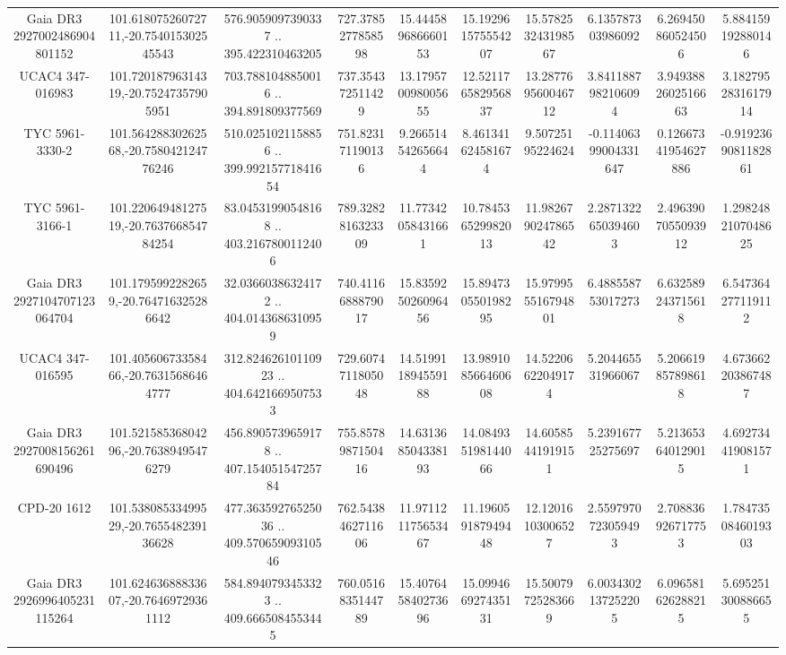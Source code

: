 \begin{table}
\begin{tabular}{cccccccccc}
Gaia DR3 2927002486904801152 & 101.61807526072711,-20.754015302545543 & 576.9059097390337 .. 395.422310463205 & 727.3785277858598 & 15.444589686660153 & 15.192961575554207 & 15.578253243198567 & 6.135787303986092 & 6.269450860524506 & 5.884159192880146 \\
UCAC4 347-016983 & 101.72018796314319,-20.75247357905951 & 703.7881048850016 .. 394.891809377569 & 737.354372511429 & 13.179570098005655 & 12.521176582956837 & 13.287769560046712 & 3.8411887982106094 & 3.9493882602516663 & 3.1827952831617914 \\
TYC 5961-3330-2 & 101.56428830262568,-20.758042124776246 & 510.0251021158856 .. 399.99215771841654 & 751.823171190136 & 9.266514542656644 & 8.461341624581674 & 9.50725195224624 & -0.11406399004331647 & 0.12667341954627886 & -0.9192369081182861 \\
TYC 5961-3166-1 & 101.22064948127519,-20.763766854784254 & 83.04531990548168 .. 403.2167800112406 & 789.3282816323309 & 11.77342058431661 & 10.784536529982013 & 11.982679024786542 & 2.2871322650394603 & 2.4963907055093912 & 1.2982482107048625 \\
Gaia DR3 2927104707123064704 & 101.1795992282659,-20.764716325286642 & 32.03660386324172 .. 404.0143686310959 & 740.4116688879017 & 15.835925026096456 & 15.894730550198295 & 15.979955516794801 & 6.488558753017273 & 6.632589243715618 & 6.547364277119112 \\
UCAC4 347-016595 & 101.40560673358466,-20.76315686464777 & 312.82462610110923 .. 404.6421669507533 & 729.6074711805048 & 14.519911894559188 & 13.989108566460608 & 14.52206622049174 & 5.204465531966067 & 5.206619857898618 & 4.673662203867487 \\
Gaia DR3 2927008156261690496 & 101.52158536804296,-20.76389495476279 & 456.8905739659178 .. 407.15405154725784 & 755.8578987150416 & 14.631368504338193 & 14.084935198144066 & 14.60585441919151 & 5.239167725275697 & 5.213653640129015 & 4.692734419081571 \\
CPD-20  1612 & 101.53808533499529,-20.765548239136628 & 477.36359276525036 .. 409.57065909310546 & 762.5438462711606 & 11.971121175653467 & 11.196059187949448 & 12.12016103006527 & 2.5597970723059493 & 2.708836926717753 & 1.7847350846019303 \\
Gaia DR3 2926996405231115264 & 101.62463688833607,-20.76469729361112 & 584.8940793453323 .. 409.6665084553445 & 760.0516835144789 & 15.407645840273696 & 15.099466927435131 & 15.50079725283669 & 6.0034302137252205 & 6.096581626288215 & 5.695251300886655 \\

\end{tabular}
\end{table}

